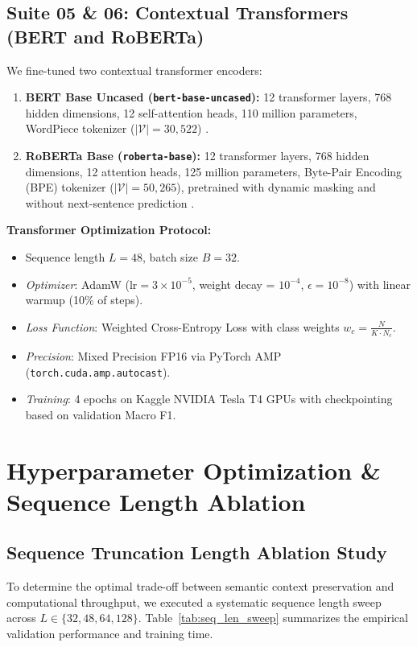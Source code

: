 \documentclass[12pt,a4paper]{article}
\begin{document}
\subsection{Suite 05 \& 06: Contextual Transformers (BERT and RoBERTa)}
We fine-tuned two contextual transformer encoders:
\begin{enumerate}
    \item \textbf{BERT Base Uncased (\texttt{bert-base-uncased}):} 12 transformer layers, 768 hidden dimensions, 12 self-attention heads, 110 million parameters, WordPiece tokenizer ($|\mathcal{V}| = 30,522$) \cite{devlin2019bert}.
    \item \textbf{RoBERTa Base (\texttt{roberta-base}):} 12 transformer layers, 768 hidden dimensions, 12 attention heads, 125 million parameters, Byte-Pair Encoding (BPE) tokenizer ($|\mathcal{V}| = 50,265$), pretrained with dynamic masking and without next-sentence prediction \cite{liu2019roberta}.
\end{enumerate}
\textbf{Transformer Optimization Protocol:}
\begin{itemize}
    \item Sequence length $L = 48$, batch size $B = 32$.
    \item \textit{Optimizer}: AdamW ($\text{lr} = 3 \times 10^{-5}$, weight decay = $10^{-4}$, $\epsilon = 10^{-8}$) with linear warmup (10\% of steps).
    \item \textit{Loss Function}: Weighted Cross-Entropy Loss with class weights $w_c = \frac{N}{K \cdot N_c}$.
    \item \textit{Precision}: Mixed Precision FP16 via PyTorch AMP (\texttt{torch.cuda.amp.autocast}).
    \item \textit{Training}: 4 epochs on Kaggle NVIDIA Tesla T4 GPUs with checkpointing based on validation Macro F1.
\end{itemize}

\section{Hyperparameter Optimization \& Sequence Length Ablation}

\subsection{Sequence Truncation Length Ablation Study}
To determine the optimal trade-off between semantic context preservation and computational throughput, we executed a systematic sequence length sweep across $L \in \{32, 48, 64, 128\}$. Table~\ref{tab:seq_len_sweep} summarizes the empirical validation performance and training time.
\end{document}
